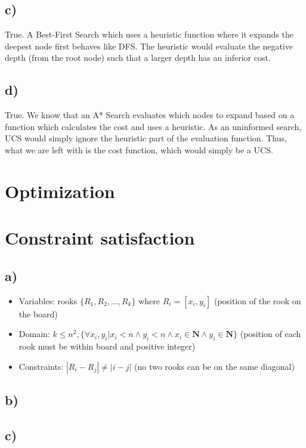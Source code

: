 \documentclass[11pt,letterpaper]{article}
\begin{document}
	    \subsection{c)}
	    True.
	    A Best-First Search which uses a heuristic function where it expands the deepest node first behaves like DFS.
	    The heuristic would evaluate the negative depth (from the root node) such that a larger depth has an inferior cost.
	    
	    \subsection{d)}
	    True.
	    We know that an A* Search evaluates which nodes to expand based on a function which calculates the cost and uses a heuristic.
	    As an uninformed search, UCS would simply ignore the heuristic part of the evaluation function.
	    Thus, what we are left with is the cost function, which would simply be a UCS.
	
	\section{Optimization}
	
	\section{Constraint satisfaction}
	    \subsection{a)}
	    \begin{itemize}
            \item Variables: rooks $\{R_1, R_2, ... , R_k\}$ where $R_i = [x_i, y_i]$ (position of the rook on the board)
            \item Domain: $k \leq n^2, \{\forall x_i, y_i | x_i < n \wedge y_i < n \wedge x_i \in \mathbf{N} \wedge y_i \in \mathbf{N}\}$ (position of each rook must be within board and positive integer)
            \item Constraints: $\left|R_i - R_j\right| \neq \left|i - j\right|$ (no two rooks can be on the same diagonal)
        \end{itemize}
        
        \subsection{b)}
        
        
        \subsection{c)}
        
	
\end{document}
